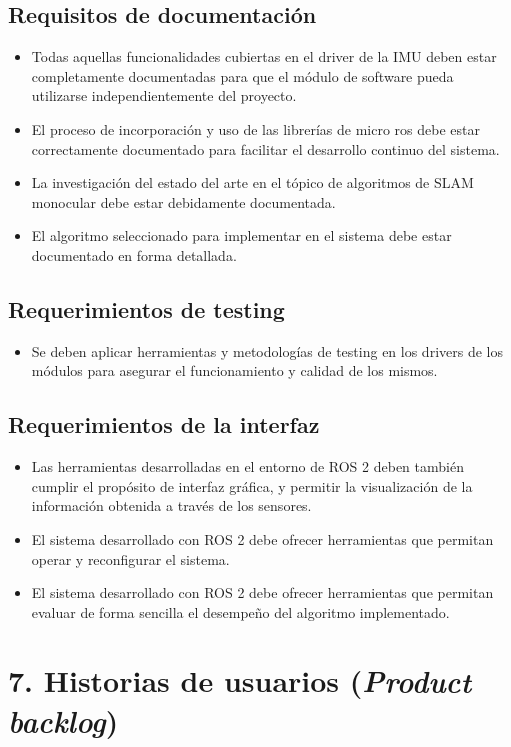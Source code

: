 \documentclass[
11pt, %
codirector, %
]{charter}
\begin{document}
\subsection{Requisitos de documentación}
\begin{itemize}
	\item Todas aquellas funcionalidades cubiertas en el driver de la IMU deben estar completamente documentadas para que el módulo de software pueda utilizarse independientemente del proyecto.
	\item El proceso de incorporación y uso de las librerías de micro ros debe estar correctamente documentado para facilitar el desarrollo continuo del sistema.
	\item La investigación del estado del arte en el tópico de algoritmos de SLAM monocular debe estar debidamente documentada.
	\item El algoritmo seleccionado para implementar en el sistema debe estar documentado en forma detallada.
\end{itemize}

\subsection{Requerimientos de testing}
\begin{itemize}
	\item Se deben aplicar herramientas y metodologías de testing en los drivers de los módulos para asegurar el funcionamiento y calidad de los mismos.
\end{itemize}

\subsection{Requerimientos de la interfaz}
\begin{itemize}
	\item Las herramientas desarrolladas en el entorno de ROS 2 deben también cumplir el propósito de interfaz gráfica, y permitir la visualización de la información obtenida a través de los sensores.
	\item El sistema desarrollado con ROS 2 debe ofrecer herramientas que permitan operar y reconfigurar el sistema.
	\item El sistema desarrollado con ROS 2 debe ofrecer herramientas que permitan evaluar de forma sencilla el desempeño del algoritmo implementado.
\end{itemize}

\section{7. Historias de usuarios (\textit{Product backlog})}
\label{sec:backlog}
\end{document}
